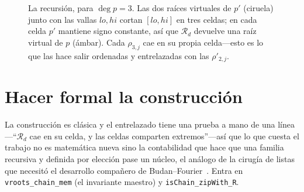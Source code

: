\documentclass[11pt]{article}
\newcommand{\lean}[1]{\texttt{#1}}
\newcommand{\Rd}{\mathcal{R}}
\begin{document}
\begin{figure}[htbp]
\centering
{}
\caption{La recursi\'on, para $\deg p = 3$. Las dos ra\'ices virtuales de $p'$ (ciruela) junto con las
vallas $lo,hi$ cortan $[lo,hi]$ en tres celdas; en cada celda $p'$ mantiene signo constante, as\'i que
$\Rd_d$ devuelve una ra\'iz virtual de $p$ (\'ambar). Cada $\rho_{3,j}$ cae en su propia celda---esto
es lo que las hace salir ordenadas y entrelazadas con las $\rho'_{2,j}$.}
\label{fig:construct}
\end{figure}

\section{Hacer formal la construcci\'on}\label{sec:q3}

La construcci\'on es cl\'asica y el entrelazado tiene una prueba a mano de una l\'inea---``$\Rd_d$ cae
en su celda, y las celdas comparten extremos''---as\'i que lo que cuesta el trabajo no es matem\'atica
nueva sino la contabilidad que hace que una familia recursiva y definida por elecci\'on pase un
n\'ucleo, el an\'alogo de la cirug\'ia de listas que necesit\'o el desarrollo compa\~nero de
Budan--Fourier~\cite{bflean}. Entra en \lean{vroots\_chain\_mem} (el invariante maestro) y
\lean{isChain\_zipWith\_R}.
\end{document}

